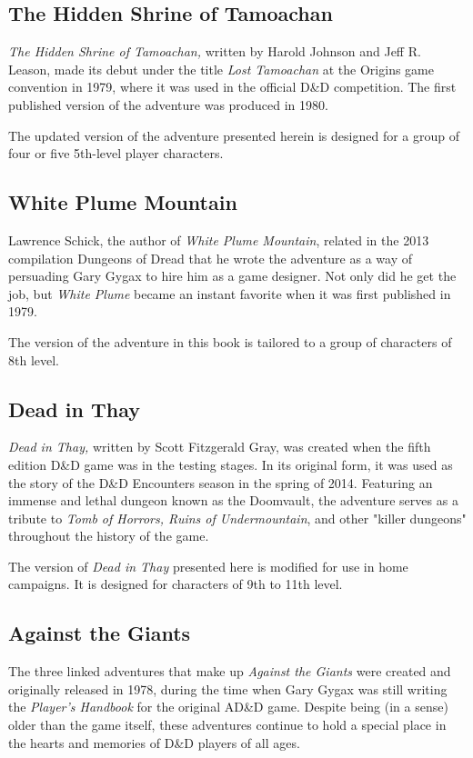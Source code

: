 \documentclass[10pt,a4paper,twoside,bg=print,twocolumn,openany,nodeprecatedcode]{dndbook}
\begin{document}
\subsection{The Hidden Shrine of Tamoachan}
\textit{The Hidden Shrine of Tamoachan,} written by Harold Johnson and Jeff R. Leason, made its debut under the title \textit{Lost Tamoachan} at the Origins game convention in 1979, where it was used in the official D\&D competition. The first published version of the adventure was produced in 1980.

The updated version of the adventure presented herein is designed for a group of four or five 5th-level player characters.

\subsection{White Plume Mountain}
Lawrence Schick, the author of \textit{White Plume Mountain}, related in the 2013 compilation Dungeons of Dread that he wrote the adventure as a way of persuading Gary Gygax to hire him as a game designer. Not only did he get the job, but \textit{White Plume} became an instant favorite when it was first published in 1979.

The version of the adventure in this book is tailored to a group of characters of 8th level.

\subsection{Dead in Thay}
\textit{Dead in Thay,} written by Scott Fitzgerald Gray, was created when the fifth edition D\&D game was in the testing stages. In its original form, it was used as the story of the D\&D Encounters season in the spring of 2014. Featuring an immense and lethal dungeon known as the Doomvault, the adventure serves as a tribute to \textit{Tomb of Horrors, Ruins of Undermountain}, and other "killer dungeons" throughout the history of the game.

The version of \textit{Dead in Thay} presented here is modified for use in home campaigns. It is designed for characters of 9th to 11th level.

\subsection{Against the Giants}
The three linked adventures that make up \textit{Against the Giants} were created and originally released in 1978, during the time when Gary Gygax was still writing the \textit{Player's Handbook} for the original AD\&D game. Despite being (in a sense) older than the game itself, these adventures continue to hold a special place in the hearts and memories of D\&D players of all ages.
\end{document}
